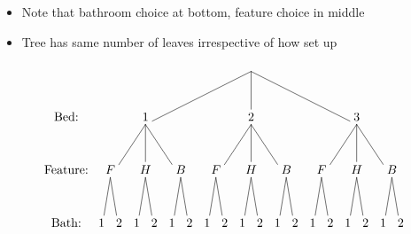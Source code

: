 \documentclass{beamer}
\theoremstyle{definition}
\begin{document}
\begin{frame}
\begin{itemize}
\item Note that bathroom choice at bottom, feature choice in middle
\item Tree has same number of leaves irrespective of how set up
\end{itemize}
\[\begin{xy}<.5cm,0cm>:
(8.5,0)="0";
(2.5,-3)="1";
(8.5,-3)="2";
(14.5,-3)="3";
"0";"1"*+!D{1}**\dir{-};
"0";"2"*+!D{2}**\dir{-};
"0";"3"*+!D{3}**\dir{-};
(.5,-6)="11";
(2.5,-6)="12";
(4.5,-6)="13";
(6.5,-6)="21";
(8.5,-6)="22";
(10.5,-6)="23";
(12.5,-6)="31";
(14.5,-6)="32";
(16.5,-6)="33";
"1";"11"*+!D{F}**\dir{-};
"1";"12"*+!D{H}**\dir{-};
"1";"13"*+!D{B}**\dir{-};
"2";"21"*+!D{F}**\dir{-};
"2";"22"*+!D{H}**\dir{-};
"2";"23"*+!D{B}**\dir{-};
"3";"31"*+!D{F}**\dir{-};
"3";"32"*+!D{H}**\dir{-};
"3";"33"*+!D{B}**\dir{-};
"11";(0,-9)*+!D{1}**\dir{-};
"11";(1,-9)*+!D{2}**\dir{-};
"12";(2,-9)*+!D{1}**\dir{-};
"12";(3,-9)*+!D{2}**\dir{-};
"13";(4,-9)*+!D{1}**\dir{-};
"13";(5,-9)*+!D{2}**\dir{-};
"21";(6,-9)*+!D{1}**\dir{-};
"21";(7,-9)*+!D{2}**\dir{-};
"22";(8,-9)*+!D{1}**\dir{-};
"22";(9,-9)*+!D{2}**\dir{-};
"23";(10,-9)*+!D{1}**\dir{-};
"23";(11,-9)*+!D{2}**\dir{-};
"31";(12,-9)*+!D{1}**\dir{-};
"31";(13,-9)*+!D{2}**\dir{-};
"32";(14,-9)*+!D{1}**\dir{-};
"32";(15,-9)*+!D{2}**\dir{-};
"33";(16,-9)*+!D{1}**\dir{-};
"33";(17,-9)*+!D{2}**\dir{-};
(-2,-3)*+!D{\text{Bed:}};
(-2,-6)*+!D{\text{Feature:}};
(-2,-9)*+!D{\text{Bath:}};
\end{xy}\]
\end{frame}
\end{document}
